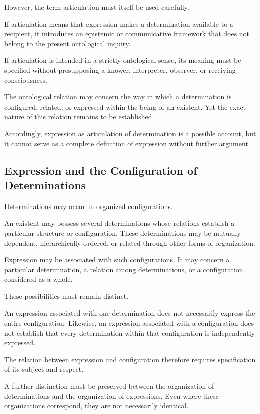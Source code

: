 However, the term articulation must itself be
used carefully.

If articulation means that expression makes
a determination available to a recipient,
it introduces an epistemic or communicative
framework that does not belong to the present
ontological inquiry.

If articulation is intended in a strictly
ontological sense, its meaning must be specified
without presupposing a knower, interpreter,
observer, or receiving consciousness.

The ontological relation may concern the way
in which a determination is configured, related,
or expressed within the being of an existent.
Yet the exact nature of this relation remains
to be established.

Accordingly, expression as articulation of
determination is a possible account, but it
cannot serve as a complete definition of
expression without further argument.

\subsection{Expression and the Configuration of Determinations}

Determinations may occur in organized configurations.

An existent may possess several determinations
whose relations establish a particular structure
or configuration. These determinations may be
mutually dependent, hierarchically ordered,
or related through other forms of organization.

Expression may be associated with such configurations.
It may concern a particular determination, a relation
among determinations, or a configuration considered
as a whole.

These possibilities must remain distinct.

An expression associated with one determination
does not necessarily express the entire configuration.
Likewise, an expression associated with a configuration
does not establish that every determination within
that configuration is independently expressed.

The relation between expression and configuration
therefore requires specification of its subject
and respect.

A further distinction must be preserved between
the organization of determinations and the organization
of expressions. Even where these organizations
correspond, they are not necessarily identical.

